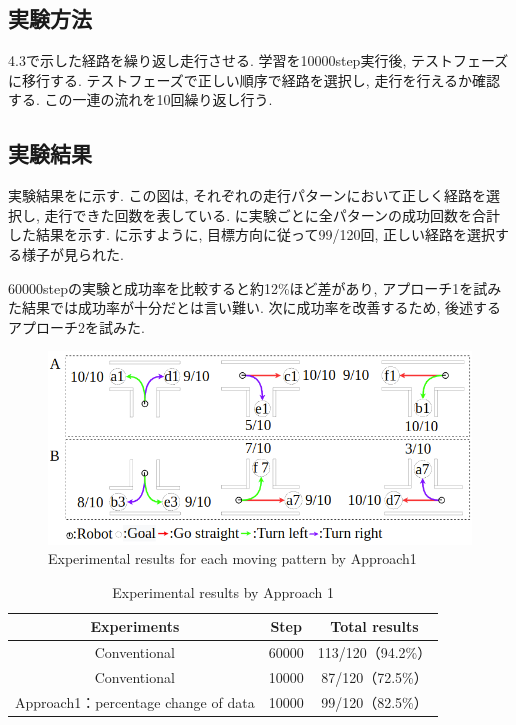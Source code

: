   \subsection{実験方法}
  4.3で示した経路を繰り返し走行させる. 学習を10000step実行後, テストフェーズに移行する. テストフェーズで正しい順序で経路を選択し, 走行を行えるか確認する. この一連の流れを10回繰り返し行う.
  \subsection{実験結果}
  実験結果をに示す. この図は, それぞれの走行パターンにおいて正しく経路を選択し, 走行できた回数を表している. に実験ごとに全パターンの成功回数を合計した結果を示す. 
  に示すように, 目標方向に従って99/120回, 正しい経路を選択する様子が見られた. 
  \par
  60000stepの実験と成功率を比較すると約12\%ほど差があり, アプローチ1を試みた結果では成功率が十分だとは言い難い. 次に成功率を改善するため, 後述するアプローチ2を試みた.


  \begin{figure}[hbtp]
    \centering
   \includegraphics[keepaspectratio, scale=0.4]
        {images/10000step_act1.0.png}
   \caption{Experimental results for each moving pattern by Approach1}
   \label{Fig:10000step_act1.0}
  \end{figure}  
  

  \begin{table}[hbtp]
    \caption{Experimental results by Approach 1}
    \label{table:result3}
    \centering
    \begin{tabular}{|c|c|c|}
      \hline
      Experiments & Step & Total results\\
      \hline
      Conventional & 60000 & 113/120（94.2\%）\\
      \hline
      Conventional & 10000 & 87/120（72.5\%）\\
      \hline
      Approach1：percentage change of data & 10000 & 99/120（82.5\%）\\
      \hline
    \end{tabular}
  \end{table}

